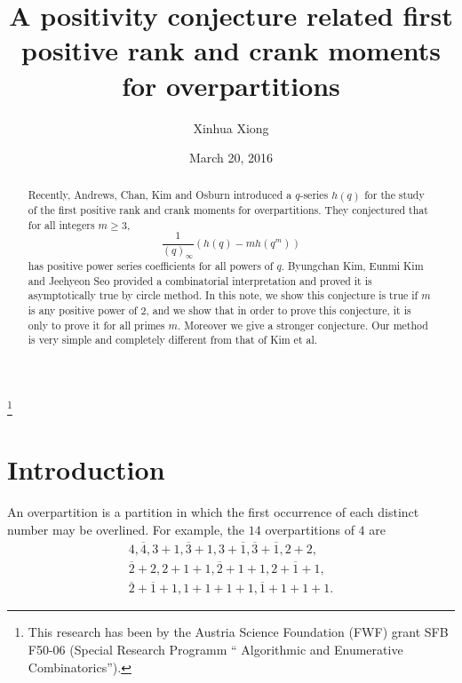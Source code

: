 \documentclass[11pt,reqno]{amsart}
\theoremstyle{definition}
\numberwithin{equation}{section}
\begin{document}
\title[A positivity conjecture]
{A positivity conjecture related first positive rank and crank moments for overpartitions}


\author{Xinhua Xiong }
\address{Research Institute for Symbolic Computation, Johannes Kepler University\\ A4040 Linz, Austria}






\thanks{This research has been by the Austria Science Foundation (FWF) grant SFB F50-06 (Special Research Programm `` Algorithmic and Enumerative Combinatorics'').}


\date{March 20, 2016}

\begin{abstract}
Recently, Andrews, Chan, Kim and Osburn introduced a $q$-series $h(q)$ for the study of the first positive rank and crank moments for overpartitions. They conjectured that for all integers $m \geq 3$,
\begin{equation*}\label{hqcon}
\frac{1}{(q)_{\infty}} (h(q) - m h(q^{m}))
\end{equation*}
has positive power series coefficients for all powers of $q$. Byungchan Kim, Eunmi Kim and Jeehyeon Seo provided a combinatorial  interpretation and proved it is asymptotically true by circle method.  In this note, we show this conjecture is true if $m$ is any positive power of $2$, and we show that in order to prove this conjecture, it is only to prove it for all primes $m$. Moreover we give a stronger conjecture. Our method is very simple and completely different from that of Kim et al.
\end{abstract}


\maketitle

\section{Introduction}
An overpartition \cite{lcc} is a partition in which the first occurrence of each distinct number may be overlined. For example, the $14$ overpartitions of $4$ are
\begin{equation*}
\begin{gathered}
4, \overline{4}, 3+1, \overline{3} + 1, 3 + \overline{1},
\overline{3} + \overline{1}, 2+2,\\ \overline{2}
+ 2, 2+1+1, \overline{2} + 1 + 1, 2+ \overline{1} + 1, \\
\overline{2} + \overline{1} + 1, 1+1+1+1, \overline{1} + 1 + 1 +1.
\end{gathered}
\end{equation*}
\end{document}
